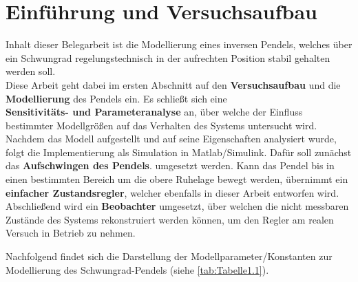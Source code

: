 \pagestyle{aaron}
\section{Einführung und Versuchsaufbau}\label{sec:Einfuehrung}

Inhalt dieser Belegarbeit ist die Modellierung eines inversen Pendels, welches über ein Schwungrad regelungstechnisch in der aufrechten Position stabil gehalten werden soll. \\

Diese Arbeit geht dabei im ersten Abschnitt auf den \textbf{Versuchsaufbau} und die \textbf{Modellierung} des Pendels ein. Es schließt sich eine \\ \textbf{Sensitivitäts- und Parameteranalyse} an, über welche der Einfluss bestimmter Modellgrößen auf das Verhalten des Systems untersucht wird. \\
Nachdem das Modell aufgestellt und auf seine Eigenschaften analysiert wurde, folgt die Implementierung als Simulation in Matlab/Simulink. Dafür soll zunächst das \textbf{Aufschwingen des Pendels}. umgesetzt werden. Kann das Pendel bis in einen bestimmten Bereich um die obere Ruhelage bewegt werden, übernimmt ein \textbf{einfacher Zustandsregler}, welcher ebenfalls in dieser Arbeit entworfen wird. \\
Abschließend wird ein \textbf{Beobachter} umgesetzt, über welchen die nicht messbaren Zustände des Systems rekonstruiert werden können, um den Regler am realen Versuch in Betrieb zu nehmen.

Nachfolgend findet sich die Darstellung der Modellparameter/Konstanten zur Modellierung des Schwungrad-Pendels (siehe \autoref{tab:Tabelle1.1}).


